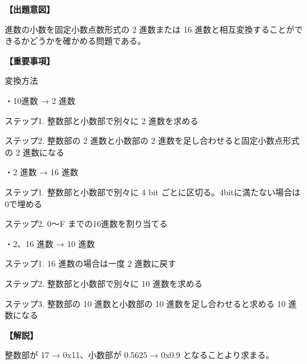 \noindent \textbf{【出題意図】}

 進数の小数を固定小数点数形式の 2 進数または 16 進数と相互変換することができるかどうかを確かめる問題である。

\vspace{1em}
\noindent \textbf{【重要事項】}

\noindent 変換方法

\medskip
\noindent ・10進数 → 2 進数

\medskip
\noindent ステップ1. 整数部と小数部で別々に 2 進数を求める 

\noindent ステップ2. 整数部の 2 進数と小数部の 2 進数を足し合わせると固定小数点形式の 2 進数になる 

\medskip
\noindent ・2 進数 → 16 進数

\medskip
\noindent ステップ1. 整数部と小数部で別々に 4 bit ごとに区切る。4bitに満たない場合は0で埋める

\noindent ステップ2. 0〜F までの16進数を割り当てる


\medskip
\noindent ・2、16 進数 → 10 進数

\medskip
\noindent ステップ1. 16 進数の場合は一度 2 進数に戻す

\noindent ステップ2. 整数部と小数部で別々に 10 進数を求める 

\noindent ステップ3. 整数部の 10 進数と小数部の 10 進数を足し合わせると求める 10 進数になる 


\vspace{1em}
\noindent \textbf{【解説】}

\noindent 整数部が 17 → 0x11、小数部が 0.5625 → 0x0.9 となることより求まる。
